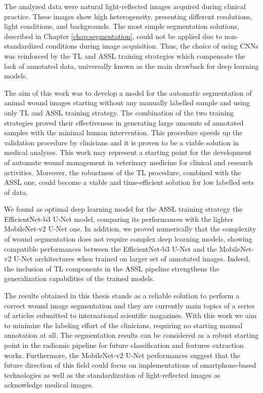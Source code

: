 \documentclass[../main.tex]{subfiles}
\begin{document}
The analyzed data were natural light-reflected images acquired during clinical practice.
These images show high heterogeneity, presenting different resolutions, light conditions, and backgrounds. 
The most simple segmentation solutions, described in Chapter \ref{chap:segmentation}, could not be applied due to non-standardized conditions during image acquisition. 
Thus, the choice of using CNNs was reinforced by the TL and ASSL training strategies which compensate the lack of annotated data, universally known as the main drawback for deep learning models.

The aim of this work was to develop a model for the automatic segmentation of animal wound images starting without any manually labelled sample and using only TL and ASSL training strategy. 
The combination of the two training strategies proved their effectiveness in generating large amounts of annotated samples with the minimal human intervention. 
This procedure speeds up the validation procedure by clinicians and it is proven to be a viable solution in medical analyses.
This work may represent a starting point for the development of automate wound management in veterinary medicine for clinical and research activities. Moreover, the robustness of the TL procedure, combined with the ASSL one, could become a viable and time-efficient solution for low labelled sets of data.

We found as optimal deep learning model for the ASSL training strategy the EfficientNet-b3 U-Net model, comparing its performances with the lighter MobileNet-v2 U-Net one.
In addition, we proved numerically that the complexity of wound segmentation does not require complex deep learning models, showing compatible performances between the EfficientNet-b3 U-Net and the MobileNet-v2 U-Net architectures when trained on larger set of annotated images. 
Indeed, the inclusion of TL components in the ASSL pipeline strengthens the generalization capabilities of the trained models.

The results obtained in this thesis stands as a reliable solution to perform a correct wound image segmentation and they are currently main topics of a series of articles submitted to international scientific magazines. 
With this work we aim to minimize the labeling effort of the clinicians, requiring no starting manual annotation at all. The segmentation results can be considered as a robust starting point in the radiomic pipeline for future classification and features extraction works.
Furthermore, the MobileNet-v2 U-Net performances suggest that the future direction of this field could focus on implementations of smartphone-based technologies as well as the standardization of light-reflected images as acknowledge medical images.
\end{document}
